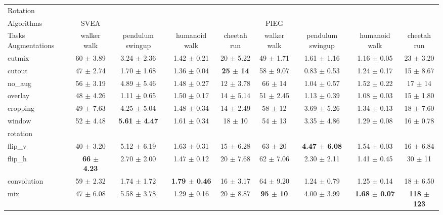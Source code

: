 \begin{tabular}{lcccccccc}
Rotation & & & & & & & & \\
Algorithms & SVEA & & & & PIEG & & & \\
Tasks Augmentations & walker walk & pendulum swingup & humanoid walk & cheetah run & walker walk & pendulum swingup & humanoid walk & cheetah run \\
cutmix          & 60 $\pm$ 3.89 & 3.24 $\pm$ 2.36 & 1.42 $\pm$ 0.21 & 20 $\pm$ 5.22 & 49 $\pm$ 1.71 & 1.61 $\pm$ 1.16 & 1.16 $\pm$ 0.05 & 23 $\pm$ 3.20 \\
cutout          & 47 $\pm$ 2.74 & 1.70 $\pm$ 1.68 & 1.36 $\pm$ 0.04 & \textbf{25 $\pm$ 14} & 58 $\pm$ 9.07 & 0.83 $\pm$ 0.53 & 1.24 $\pm$ 0.17 & 15 $\pm$ 8.67 \\
no\_aug         & 56 $\pm$ 3.19 & 4.89 $\pm$ 5.46 & 1.48 $\pm$ 0.27 & 12 $\pm$ 3.78 & 66 $\pm$ 14 & 1.04 $\pm$ 0.57 & 1.52 $\pm$ 0.22 & 17 $\pm$ 14 \\
overlay         & 48 $\pm$ 4.26 & 1.11 $\pm$ 0.65 & 1.50 $\pm$ 0.17 & 14 $\pm$ 5.14 & 51 $\pm$ 2.45 & 1.13 $\pm$ 0.39 & 1.08 $\pm$ 0.03 & 15 $\pm$ 1.80 \\
cropping        & 49 $\pm$ 7.63 & 4.25 $\pm$ 5.04 & 1.48 $\pm$ 0.34 & 14 $\pm$ 2.49 & 58 $\pm$ 12 & 3.69 $\pm$ 5.26 & 1.34 $\pm$ 0.13 & 18 $\pm$ 7.60 \\
window          & 52 $\pm$ 4.48 & \textbf{5.61 $\pm$ 4.47} & 1.61 $\pm$ 0.34 & 18 $\pm$ 10 & 54 $\pm$ 13 & 3.35 $\pm$ 4.86 & 1.29 $\pm$ 0.08 & 16 $\pm$ 0.78 \\
rotation        &  &  &  &  &  &  &  &  \\
flip\_v         & 40 $\pm$ 3.20 & 5.12 $\pm$ 6.19 & 1.63 $\pm$ 0.31 & 15 $\pm$ 6.28 & 63 $\pm$ 20 & \textbf{4.47 $\pm$ 6.08} & 1.54 $\pm$ 0.03 & 16 $\pm$ 6.84 \\
flip\_h         & \textbf{66 $\pm$ 4.23} & 2.70 $\pm$ 2.00 & 1.47 $\pm$ 0.12 & 20 $\pm$ 7.68 & 62 $\pm$ 7.06 & 2.30 $\pm$ 2.11 & 1.41 $\pm$ 0.45 & 30 $\pm$ 11 \\
convolution     & 59 $\pm$ 2.32 & 1.74 $\pm$ 1.72 & \textbf{1.79 $\pm$ 0.46} & 16 $\pm$ 3.17 & 64 $\pm$ 9.20 & 1.24 $\pm$ 0.79 & 1.25 $\pm$ 0.14 & 18 $\pm$ 6.50 \\
mix             & 47 $\pm$ 6.08 & 5.58 $\pm$ 3.78 & 1.29 $\pm$ 0.16 & 20 $\pm$ 8.87 & \textbf{95 $\pm$ 10} & 4.00 $\pm$ 3.99 & \textbf{1.68 $\pm$ 0.07} & \textbf{118 $\pm$ 123} \\
\end{tabular}